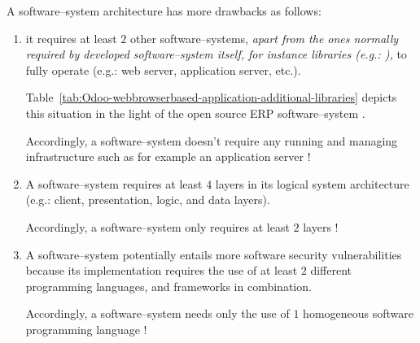 A \webbrowserbased software--system
architecture has more drawbacks as
follows:

\begin{enumerate}[1.]
	\item it requires at least $2$ other 
		software--systems, \emph{apart from
		the ones normally required by developed
		software--system itself, for instance libraries (e.g.:
		\logFourJ),} to fully operate
		(e.g.: web server, application server, etc.).
		
		Table~\ref{tab:Odoo-webbrowserbased-application-additional-libraries}
		depicts this situation in the light of the
		open source ERP software--system \Odoo.	
		
		\textcolor{purplish}{Accordingly, a \thickclient
		software--system doesn't require any running and 
		managing infrastructure such as for example an
		application server !}	
				
	\item A \webbrowserbased software--system
		requires at least $4$ layers in
		its logical system architecture
		(e.g.: client, presentation, logic,
		and data layers).
		
		\textcolor{purplish}{Accordingly, a \thickclient
		software--system only requires at least $2$ layers !}

	\item A \webbrowserbased software--system
		potentially entails more software security
		vulnerabilities because its implementation requires
		the use of at least $2$ different programming
		languages, and frameworks in combination.
		
		\textcolor{purplish}{Accordingly, a \thickclient
		software--system needs only the use of $1$ homogeneous
		software programming language !}
\end{enumerate}

